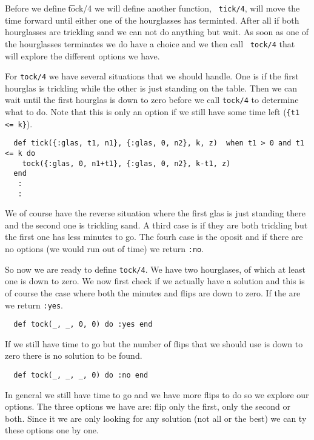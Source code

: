 \documentclass[a4paper,11pt]{article}
\begin{document}
Before we define {\t tock/4} we will define another function, {\tt
  tick/4}, will move the time forward until either one of the
hourglasses has terminted. After all if both hourglasses are trickling
sand we can not do anything but wait. As soon as one of the
hourglasses terminates we do have a choice and we then call {\tt
  tock/4} that will explore the different options we have.

For {\tt tock/4} we have several situations that we should handle.
One is if the first hourglas is trickling while the other is just
standing on the table. Then we can wait until the first hourglas is
down to zero before we call {\tt tock/4} to determine what to do. Note
that this is only an option if we still have some time left ({\tt \{t1
  <= k\}}).

\begin{verbatim}
  def tick({:glas, t1, n1}, {:glas, 0, n2}, k, z)  when t1 > 0 and t1 <= k do  
    tock({:glas, 0, n1+t1}, {:glas, 0, n2}, k-t1, z)
  end
   :
   :
\end{verbatim}

We of course have the reverse situation where the first glas is just
standing there and the second one is trickling sand. A third case is
if they are both trickling but the first one has less minutes to
go. The fourh case is the oposit and if there are no options (we would
run out of time) we return {\tt :no}.

So now we are ready to define {\tt tock/4}. We have two hourglases, of
which at least one is down to zero. We now first check if we actually
have a solution and this is of course the case where both the minutes
and flips are down to zero. If the are we return {\tt :yes}.

\begin{verbatim}
  def tock(_, _, 0, 0) do :yes end
\end{verbatim}

If we still have time to go but the number of flips that we should use
is down to zero there is no solution to be found.

\begin{verbatim}
  def tock(_, _, _, 0) do :no end  
\end{verbatim}

In general we still have time to go and we have more flips to do so we
explore our options. The three options we have are: flip only the
first, only the second or both. Since it we are only looking for any
solution (not all or the best) we can ty these options one by one. 
\end{document}
